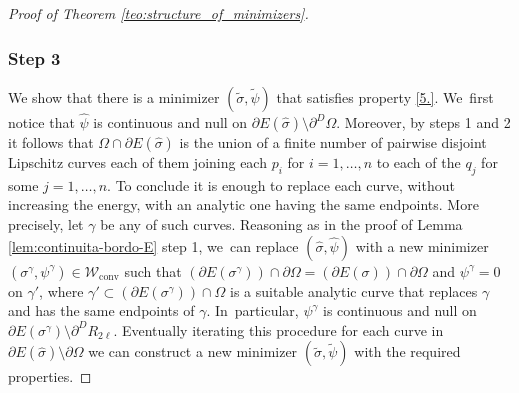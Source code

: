 \documentclass[11pt]{article}
\numberwithin{equation}{section}
\let\Om\Omega
\newcommand\admclassconv{{\mathcal W_\mathrm{conv}}}
\theoremstyle{definition}
\begin{document}
\begin{proof}[Proof of Theorem \ref{teo:structure_of_minimizers}]
\subsubsection*{Step 3} We show that there is a minimizer $(\widetilde\sigma,\widetilde\psi)$ that satisfies property \ref{5.}. We~first notice that $\widehat\psi$ is continuous and null on $\partial E(\widehat\sigma)\setminus\partial^D\Om$.
Moreover, by steps 1 and 2 it follows that $\Om\cap \partial E(\widehat\sigma)$ is the union of a finite number of pairwise disjoint Lipschitz curves each of them joining each $p_i$ for $i=1,\dots,n$ to each of the $q_j$ for some $j=1,\dots,n$.
To conclude it is enough to replace each curve, without increasing the energy, with an analytic one having the same endpoints.
More precisely, let $\gamma$ be any of such curves. Reasoning as in the proof of Lemma \ref{lem:continuita-bordo-E} step 1, we~can replace $(\widehat\sigma,\widehat\psi)$ with a new minimizer $(\sigma^\gamma,\psi^\gamma)\in\admclassconv$ such that $(\partial E(\sigma^\gamma))\cap\partial\Om=(\partial E(\sigma))\cap\partial\Om$
and
$\psi^\gamma=0$ on $\gamma'$, where
$\gamma'\subset(\partial E(\sigma^\gamma))\cap\Om$ is a suitable analytic curve that replaces $\gamma$ and has the same endpoints of $\gamma$.
In~particular, $\psi^\gamma$ is continuous and null on $\partial E(\sigma^\gamma)\setminus\partial^DR_{2\ell}$.
Eventually iterating this procedure for each curve in $\partial E(\widehat\sigma)\setminus\partial\Om$ we can construct a new minimizer
$(\widetilde\sigma,\widetilde\psi)$ with the required properties.
\end{proof}
\end{document}
